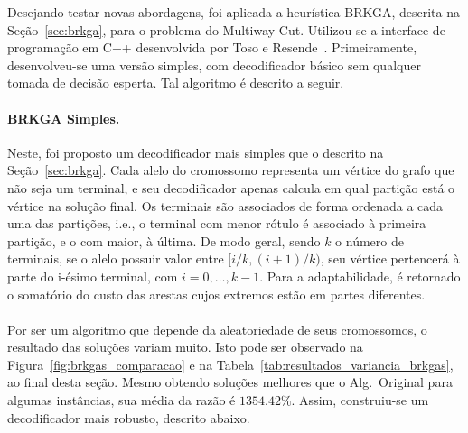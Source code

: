 \documentclass[12pt, a4paper]{article}
\begin{document}
Desejando testar novas abordagens, foi aplicada a heurística BRKGA, descrita na Seção~\ref{sec:brkga}, para o problema do Multiway Cut. Utilizou-se a interface de programação em C++ desenvolvida por Toso e Resende~\cite{TR2015}. Primeiramente, desenvolveu-se uma versão simples, com decodificador básico sem qualquer tomada de decisão esperta. Tal algoritmo é descrito a seguir.

\paragraph{BRKGA Simples.} Neste, foi proposto um decodificador mais simples que o descrito na Seção~\ref{sec:brkga}. Cada alelo do cromossomo representa um vértice do grafo que não seja um terminal, e seu decodificador apenas calcula em qual partição está o vértice na solução final. Os terminais são associados de forma ordenada a cada uma das partições, i.e., o terminal com menor rótulo é associado à primeira partição, e o com maior, à última.
De modo geral, sendo $k$ o número de terminais, se o alelo possuir valor entre $[i/k, (i+1)/k)$, seu vértice pertencerá à parte do i-ésimo terminal, com $i=0, \dots, k-1$. Para a adaptabilidade, é retornado o somatório do custo das arestas cujos extremos estão em partes diferentes.

\paragraph{}
Por ser um algoritmo que depende da aleatoriedade de seus cromossomos, o resultado das soluções variam muito. Isto pode ser observado na Figura~\ref{fig:brkgas_comparacao} e na Tabela~\ref{tab:resultados_variancia_brkgas}, ao final desta seção. Mesmo obtendo soluções melhores que o Alg.\ Original para algumas instâncias, sua média da razão é $1354.42\%$. Assim, construiu-se um decodificador mais robusto, descrito abaixo.
\end{document}
